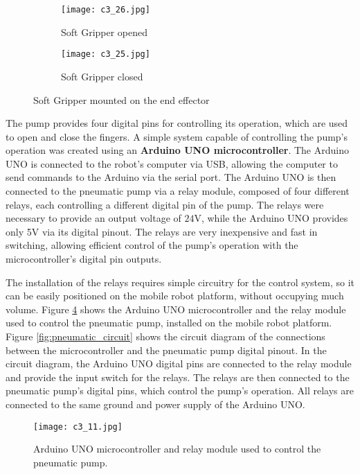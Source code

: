 \begin{figure}[t]
    \centering
    \begin{subfigure}{0.45\textwidth}
        \texttt{[image: c3\_26.jpg]}
        \caption{Soft Gripper opened}
        \label{fig:opened}
    \end{subfigure}
    \hfill %
    \begin{subfigure}{0.45\textwidth}
        \texttt{[image: c3\_25.jpg]}
        \caption{Soft Gripper closed}
        \label{fig:closed}
    \end{subfigure}
    \caption{Soft Gripper mounted on the end effector}
    \label{fig:sg_combined}
\end{figure}


The pump provides four digital pins for controlling its operation, which are used to open and close the fingers.
A simple system capable of controlling the pump's operation was created using an \textbf{Arduino UNO microcontroller}.
The Arduino UNO is connected to the robot's computer via USB, allowing the computer to send commands to the Arduino
via the serial port. The Arduino UNO is then connected to the pneumatic pump via a relay module,
composed of four different relays, each controlling a different digital pin of the pump. The relays were necessary
to provide an output voltage of $24$V, while the Arduino UNO provides only 5V via its digital pinout.
The relays are very inexpensive and fast in switching, allowing efficient
control of the pump's operation with the microcontroller's digital pin outputs.

The installation of the relays requires simple circuitry for the control system, so it can be easily positioned
on the mobile robot platform, without occupying much volume.
Figure \ref{fig:c3_img10} shows the Arduino UNO microcontroller and the relay module used to control the pneumatic pump,
installed on the mobile robot platform. Figure \ref{fig:pneumatic_circuit} shows the circuit diagram of the 
connections between the microcontroller and the pneumatic pump digital pinout. In the circuit diagram,
the Arduino UNO digital pins are connected to the relay module and provide the input switch for the relays.
The relays are then connected to the pneumatic pump's digital pins, which control the pump's operation.
All relays are connected to the same ground and power supply of the Arduino UNO.

\begin{figure}[t]
    \centering
    \texttt{[image: c3\_11.jpg]}
    \captionsetup{width=1\linewidth}
    \caption{Arduino UNO microcontroller and relay module used to control the pneumatic pump.}
    \label{fig:c3_img10}
\end{figure}

